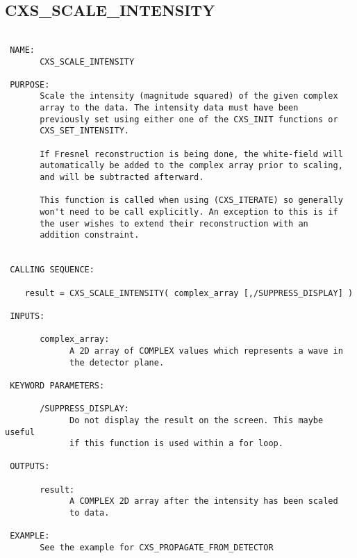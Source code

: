  
 
\subsection{CXS\_SCALE\_INTENSITY}
\begin{verbatim}

 NAME:
       CXS_SCALE_INTENSITY

 PURPOSE:
       Scale the intensity (magnitude squared) of the given complex
       array to the data. The intensity data must have been
       previously set using either one of the CXS_INIT functions or
       CXS_SET_INTENSITY.

       If Fresnel reconstruction is being done, the white-field will
       automatically be added to the complex array prior to scaling,
       and will be subtracted afterward.
       
       This function is called when using (CXS_ITERATE) so generally
       won't need to be call explicitly. An exception to this is if
       the user wishes to extend their reconstruction with an
       addition constraint.


 CALLING SEQUENCE:

	result = CXS_SCALE_INTENSITY( complex_array [,/SUPPRESS_DISPLAY] )

 INPUTS:

       complex_array:
             A 2D array of COMPLEX values which represents a wave in
             the detector plane.

 KEYWORD PARAMETERS:

       /SUPPRESS_DISPLAY:
             Do not display the result on the screen. This maybe useful
             if this function is used within a for loop. 

 OUTPUTS:

       result:
             A COMPLEX 2D array after the intensity has been scaled
             to data.

 EXAMPLE:
       See the example for CXS_PROPAGATE_FROM_DETECTOR

\end{verbatim}






  
 
